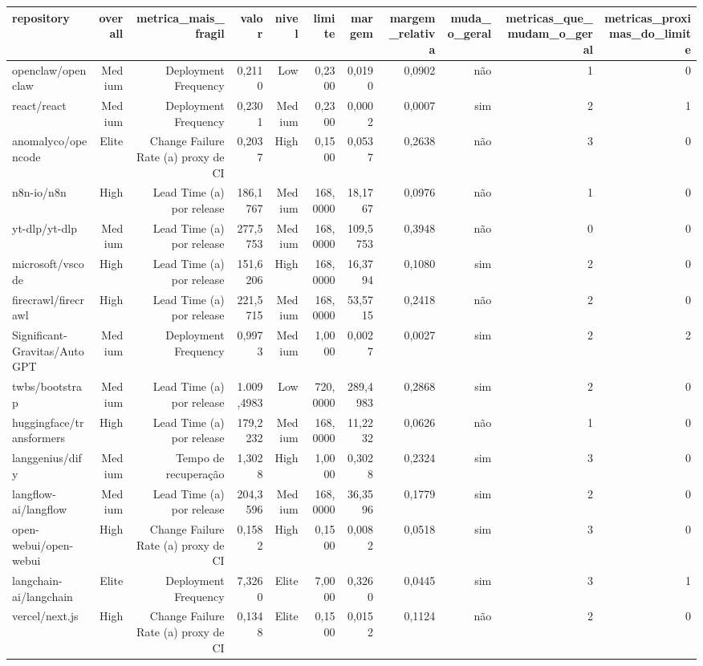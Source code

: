 \begin{tabular}{lrrrrrrrrrr}
\hline
repository & overall & metrica\_mais\_fragil & valor & nivel & limite & margem & margem\_relativa & muda\_o\_geral & metricas\_que\_mudam\_o\_geral & metricas\_proximas\_do\_limite \\
\hline
openclaw/openclaw & Medium & Deployment Frequency & 0,2110 & Low & 0,2300 & 0,0190 & 0,0902 & não & 1 & 0 \\
react/react & Medium & Deployment Frequency & 0,2301 & Medium & 0,2300 & 0,0002 & 0,0007 & sim & 2 & 1 \\
anomalyco/opencode & Elite & Change Failure Rate (a) proxy de CI & 0,2037 & High & 0,1500 & 0,0537 & 0,2638 & não & 3 & 0 \\
n8n-io/n8n & High & Lead Time (a) por release & 186,1767 & Medium & 168,0000 & 18,1767 & 0,0976 & não & 1 & 0 \\
yt-dlp/yt-dlp & Medium & Lead Time (a) por release & 277,5753 & Medium & 168,0000 & 109,5753 & 0,3948 & não & 0 & 0 \\
microsoft/vscode & High & Lead Time (a) por release & 151,6206 & High & 168,0000 & 16,3794 & 0,1080 & sim & 2 & 0 \\
firecrawl/firecrawl & High & Lead Time (a) por release & 221,5715 & Medium & 168,0000 & 53,5715 & 0,2418 & não & 2 & 0 \\
Significant-Gravitas/AutoGPT & Medium & Deployment Frequency & 0,9973 & Medium & 1,0000 & 0,0027 & 0,0027 & sim & 2 & 2 \\
twbs/bootstrap & Medium & Lead Time (a) por release & 1.009,4983 & Low & 720,0000 & 289,4983 & 0,2868 & sim & 2 & 0 \\
huggingface/transformers & High & Lead Time (a) por release & 179,2232 & Medium & 168,0000 & 11,2232 & 0,0626 & não & 1 & 0 \\
langgenius/dify & Medium & Tempo de recuperação & 1,3028 & High & 1,0000 & 0,3028 & 0,2324 & sim & 3 & 0 \\
langflow-ai/langflow & Medium & Lead Time (a) por release & 204,3596 & Medium & 168,0000 & 36,3596 & 0,1779 & sim & 2 & 0 \\
open-webui/open-webui & High & Change Failure Rate (a) proxy de CI & 0,1582 & High & 0,1500 & 0,0082 & 0,0518 & sim & 3 & 0 \\
langchain-ai/langchain & Elite & Deployment Frequency & 7,3260 & Elite & 7,0000 & 0,3260 & 0,0445 & sim & 3 & 1 \\
vercel/next.js & High & Change Failure Rate (a) proxy de CI & 0,1348 & Elite & 0,1500 & 0,0152 & 0,1124 & não & 2 & 0 \\

\end{tabular}
